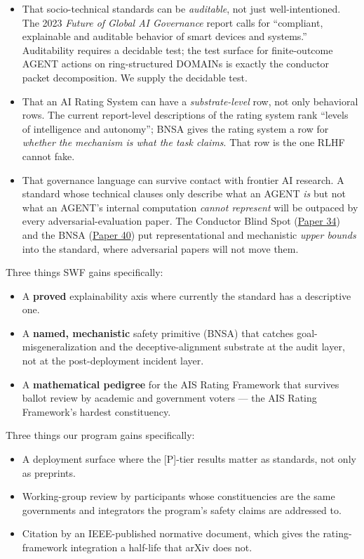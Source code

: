 \documentclass[
  letterpaper,
  11pt]{article}
\providecommand{\tightlist}{%
  \setlength{\itemsep}{0pt}\setlength{\parskip}{0pt}}
\theoremstyle{plain}
\theoremstyle{definition}
\theoremstyle{remark}
\begin{document}
\begin{itemize}
\tightlist
\item
  That socio-technical standards can be \emph{auditable}, not just well-intentioned. The 2023 \emph{Future of Global AI Governance} report calls for ``compliant, explainable and auditable behavior of smart devices and systems.'' Auditability requires a decidable test; the test surface for finite-outcome AGENT actions on ring-structured DOMAINs is exactly the conductor packet decomposition. We supply the decidable test.
\item
  That an AI Rating System can have a \emph{substrate-level} row, not only behavioral rows. The current report-level descriptions of the rating system rank ``levels of intelligence and autonomy''; BNSA gives the rating system a row for \emph{whether the mechanism is what the task claims}. That row is the one RLHF cannot fake.
\item
  That governance language can survive contact with frontier AI research. A standard whose technical clauses only describe what an AGENT \emph{is} but not what an AGENT's internal computation \emph{cannot represent} will be outpaced by every adversarial-evaluation paper. The Conductor Blind Spot (\href{C:/Projects/simplicial/34_the_conductor_blind_spot.md}{Paper 34}) and the BNSA (\href{C:/Projects/simplicial/40_base_n_shortcut_audit_as_a_safety_primitive.md}{Paper 40}) put representational and mechanistic \emph{upper bounds} into the standard, where adversarial papers will not move them.
\end{itemize}

Three things SWF gains specifically:

\begin{itemize}
\tightlist
\item
  A \textbf{proved} explainability axis where currently the standard has a descriptive one.
\item
  A \textbf{named, mechanistic} safety primitive (BNSA) that catches goal-misgeneralization and the deceptive-alignment substrate at the audit layer, not at the post-deployment incident layer.
\item
  A \textbf{mathematical pedigree} for the AIS Rating Framework that survives ballot review by academic and government voters --- the AIS Rating Framework's hardest constituency.
\end{itemize}

Three things our program gains specifically:

\begin{itemize}
\tightlist
\item
  A deployment surface where the {[}P{]}-tier results matter as standards, not only as preprints.
\item
  Working-group review by participants whose constituencies are the same governments and integrators the program's safety claims are addressed to.
\item
  Citation by an IEEE-published normative document, which gives the rating-framework integration a half-life that arXiv does not.
\end{itemize}
\end{document}
